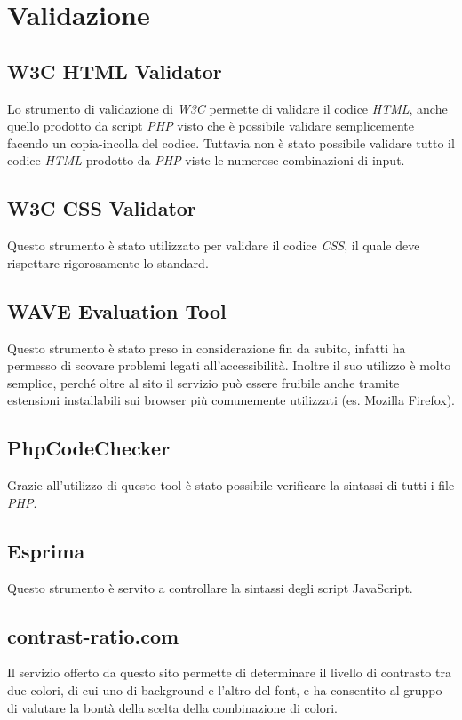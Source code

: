 \section{Validazione}

\subsection{W3C HTML Validator}
Lo strumento di validazione di \textit{W3C} permette di validare il codice \textit{HTML}, anche quello
prodotto da script \textit{PHP} visto che è possibile validare semplicemente facendo un copia-incolla del
codice. Tuttavia non è stato possibile validare tutto il codice \textit{HTML} prodotto da \textit{PHP}
viste le numerose combinazioni di input.

\subsection{W3C CSS Validator}
Questo strumento è stato utilizzato per validare il codice \textit{CSS}, il quale deve rispettare
rigorosamente lo standard.

\subsection{WAVE Evaluation Tool}
Questo strumento è stato preso in considerazione fin da subito, infatti ha permesso di scovare problemi
legati all'accessibilità. Inoltre il suo utilizzo è molto semplice, perché oltre al sito
il servizio può essere fruibile anche tramite estensioni installabili sui browser più comunemente
utilizzati (es. Mozilla Firefox).

\subsection{PhpCodeChecker}
Grazie all'utilizzo di questo tool è stato possibile verificare la sintassi di tutti i file \textit{PHP}.

\subsection{Esprima}
Questo strumento è servito a controllare la sintassi degli script JavaScript.

\subsection{contrast-ratio.com}
Il servizio offerto da questo sito permette di determinare il livello di contrasto tra due colori, di cui
uno di background e l'altro del font, e ha consentito al gruppo di valutare la bontà della scelta della
combinazione di colori.